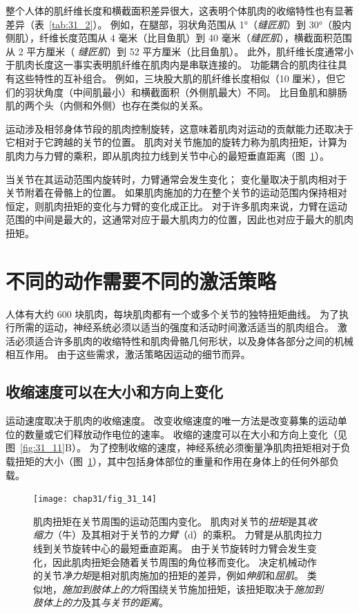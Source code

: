 整个人体的肌纤维长度和横截面积差异很大，这表明个体肌肉的收缩特性也有显著差异（表~\ref{tab:31_2}）。
例如，在腿部，羽状角范围从 1°（\textit{缝匠肌}）到 30°（股内侧肌），纤维长度范围从 4 毫米（比目鱼肌）到 40 毫米（\textit{缝匠肌}），横截面积范围从 2 平方厘米（ \textit{缝匠肌}）到 52 平方厘米（比目鱼肌）。
此外，肌纤维长度通常小于肌肉长度这一事实表明肌纤维在肌肉内是串联连接的。
功能耦合的肌肉往往具有这些特性的互补组合。
例如，三块股大肌的肌纤维长度相似（10 厘米），但它们的羽状角度（中间肌最小）和横截面积（外侧肌最大）不同。
比目鱼肌和腓肠肌的两个头（内侧和外侧）也存在类似的关系。


运动涉及相邻身体节段的肌肉控制旋转，这意味着肌肉对运动的贡献能力还取决于它相对于它跨越的关节的位置。
肌肉对关节施加的旋转力称为肌肉扭矩，计算为肌肉力与力臂的乘积，即从肌肉拉力线到关节中心的最短垂直距离（图~\ref{fig:31_14}）。


当关节在其运动范围内旋转时，力臂通常会发生变化；
变化量取决于肌肉相对于关节附着在骨骼上的位置。
如果肌肉施加的力在整个关节的运动范围内保持相对恒定，则肌肉扭矩的变化与力臂的变化成正比。
对于许多肌肉来说，力臂在运动范围的中间是最大的，这通常对应于最大肌肉力的位置，因此也对应于最大的肌肉扭矩。



\section{不同的动作需要不同的激活策略}

人体有大约 600 块肌肉，每块肌肉都有一个或多个关节的独特扭矩曲线。
为了执行所需的运动，神经系统必须以适当的强度和活动时间激活适当的肌肉组合。
激活必须适合许多肌肉的收缩特性和肌肉骨骼几何形状，以及身体各部分之间的机械相互作用。
由于这些需求，激活策略因运动的细节而异。



\subsection{收缩速度可以在大小和方向上变化}

运动速度取决于肌肉的收缩速度。
改变收缩速度的唯一方法是改变募集的运动单位的数量或它们释放动作电位的速率。
收缩的速度可以在大小和方向上变化（见图~\ref{fig:31_11}B）。
为了控制收缩的速度，神经系统必须衡量净肌肉扭矩相对于负载扭矩的大小（图~\ref{fig:31_14}），其中包括身体部位的重量和作用在身体上的任何外部负载。


\begin{figure}[htbp]
	\centering
	\texttt{[image: chap31/fig\_31\_14]}
	\caption{肌肉扭矩在关节周围的运动范围内变化。
	肌肉对关节的\textit{扭矩}是其\textit{收缩力}（牛）及其相对于关节的\textit{力臂}（d）的乘积。
	力臂是从肌肉拉力线到关节旋转中心的最短垂直距离。
	由于关节旋转时力臂会发生变化，因此肌肉扭矩会随着关节周围的角位移而变化。
	决定机械动作的关节\textit{净力矩}是相对肌肉施加的扭矩的差异，例如\textit{伸肌}和\textit{屈肌}。
	类似地，\textit{施加到肢体上的力}将围绕关节施加扭矩，该扭矩取决于\textit{施加到肢体上的力}及其\textit{与关节的距离}。}
	\label{fig:31_14}
\end{figure}



